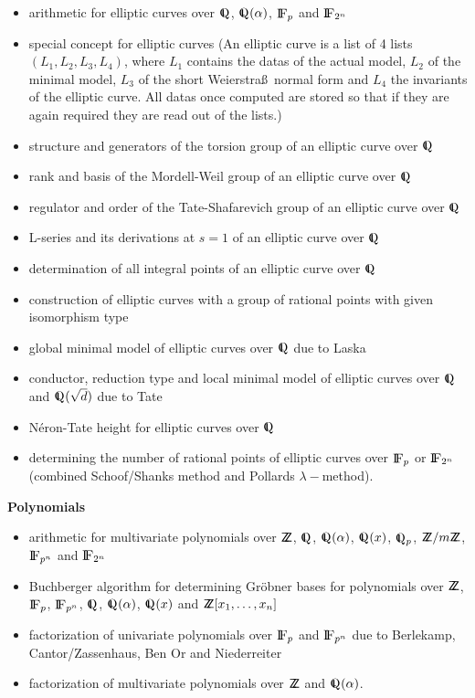 \begin{itemize}
\item arithmetic for elliptic curves over $\Q$, $\Q(\alpha)$, ${\rm{I\!F}}_p$ and ${\rm{I\!F}}_{2^n}$
\item special concept for elliptic curves (An elliptic curve is a list
of 4 lists $(L_1, L_2, L_3, L_4)$, where $L_1$ contains the datas of the
actual model, $L_2$ of the minimal model, $L_3$ of the short Weierstra\ss ~normal form
and $L_4$ the invariants of the elliptic curve. All datas once computed
are stored so that if they are again required they are read out of the
lists.)
\item structure and generators of the torsion group of an elliptic curve over $\Q$ 
\item rank and basis of the Mordell-Weil group of an elliptic curve over $\Q$ 
\item regulator and order of the Tate-Shafarevich group of an elliptic curve over $\Q$ 
\item L-series and its derivations at $s=1$ of an elliptic curve over $\Q$
\item determination of all integral points of an elliptic curve over $\Q$ 
\item construction of elliptic curves with a group of rational points with given isomorphism type
\item global minimal model of elliptic curves over $\Q$ due to Laska
\item conductor, reduction type and local minimal model of elliptic curves over $\Q$
	and $\Q(\sqrt{d})$ due to Tate
\item N\'eron-Tate height for elliptic curves over $\Q$
\item determining the number of rational points of elliptic curves over 
	${\rm{I\!F}}_p$ or ${\rm{I\!F}}_{2^n}$ (combined Schoof/Shanks method and Pollards
	$\lambda-$method).
\end{itemize}

\vspace{0.4cm}

\begin{center}
{\large {\bf Polynomials}}
\end{center}

\begin{itemize}
\item arithmetic for multivariate polynomials over ${{\sf Z}\hspace{-1.3mm}{\sf Z}}$, $\Q$, $\Q(\alpha)$,
$\Q(x)$, $\Q_p$, ${{\sf Z}\hspace{-1.3mm}{\sf Z}}/m{{\sf Z}\hspace{-1.3mm}{\sf Z}}$, ${\rm{I\!F}}_{p^n}$ and ${\rm{I\!F}}_{2^n}$
\item Buchberger algorithm for determining Gr\"obner bases 
      for polynomials over ${{\sf Z}\hspace{-1.3mm}{\sf Z}}$, ${\rm{I\!F}}_p$, ${\rm{I\!F}}_{p^n}$, $\Q$,
	$\Q(\alpha)$, $\Q(x)$ and ${{\sf Z}\hspace{-1.3mm}{\sf Z}}[x_1, \ldots, x_n]$
\item factorization of univariate polynomials over ${\rm{I\!F}}_p$
	and ${\rm{I\!F}}_{p^n}$ due to Berlekamp, Cantor/Zassen\-haus, Ben Or and
	Niederreiter
\item factorization of multivariate polynomials over ${{\sf Z}\hspace{-1.3mm}{\sf Z}}$ and 
$\Q(\alpha)$.
\end{itemize}


